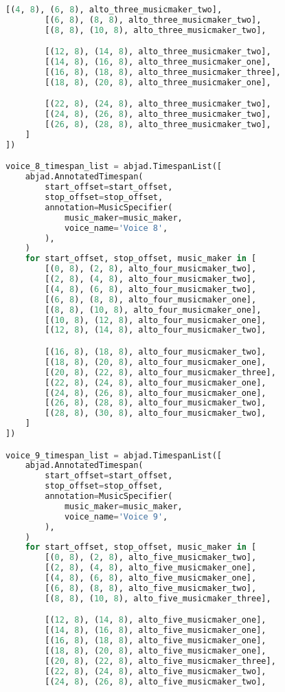 \begin{lstlisting}[language=Python, caption=Invocation Source Code]
        [(4, 8), (6, 8), alto_three_musicmaker_two],
        [(6, 8), (8, 8), alto_three_musicmaker_two],
        [(8, 8), (10, 8), alto_three_musicmaker_two],

        [(12, 8), (14, 8), alto_three_musicmaker_two],
        [(14, 8), (16, 8), alto_three_musicmaker_one],
        [(16, 8), (18, 8), alto_three_musicmaker_three],
        [(18, 8), (20, 8), alto_three_musicmaker_one],

        [(22, 8), (24, 8), alto_three_musicmaker_two],
        [(24, 8), (26, 8), alto_three_musicmaker_two],
        [(26, 8), (28, 8), alto_three_musicmaker_two],
    ]
])

voice_8_timespan_list = abjad.TimespanList([
    abjad.AnnotatedTimespan(
        start_offset=start_offset,
        stop_offset=stop_offset,
        annotation=MusicSpecifier(
            music_maker=music_maker,
            voice_name='Voice 8',
        ),
    )
    for start_offset, stop_offset, music_maker in [
        [(0, 8), (2, 8), alto_four_musicmaker_two],
        [(2, 8), (4, 8), alto_four_musicmaker_two],
        [(4, 8), (6, 8), alto_four_musicmaker_two],
        [(6, 8), (8, 8), alto_four_musicmaker_one],
        [(8, 8), (10, 8), alto_four_musicmaker_one],
        [(10, 8), (12, 8), alto_four_musicmaker_one],
        [(12, 8), (14, 8), alto_four_musicmaker_two],

        [(16, 8), (18, 8), alto_four_musicmaker_two],
        [(18, 8), (20, 8), alto_four_musicmaker_one],
        [(20, 8), (22, 8), alto_four_musicmaker_three],
        [(22, 8), (24, 8), alto_four_musicmaker_one],
        [(24, 8), (26, 8), alto_four_musicmaker_one],
        [(26, 8), (28, 8), alto_four_musicmaker_two],
        [(28, 8), (30, 8), alto_four_musicmaker_two],
    ]
])

voice_9_timespan_list = abjad.TimespanList([
    abjad.AnnotatedTimespan(
        start_offset=start_offset,
        stop_offset=stop_offset,
        annotation=MusicSpecifier(
            music_maker=music_maker,
            voice_name='Voice 9',
        ),
    )
    for start_offset, stop_offset, music_maker in [
        [(0, 8), (2, 8), alto_five_musicmaker_two],
        [(2, 8), (4, 8), alto_five_musicmaker_one],
        [(4, 8), (6, 8), alto_five_musicmaker_one],
        [(6, 8), (8, 8), alto_five_musicmaker_two],
        [(8, 8), (10, 8), alto_five_musicmaker_three],

        [(12, 8), (14, 8), alto_five_musicmaker_one],
        [(14, 8), (16, 8), alto_five_musicmaker_one],
        [(16, 8), (18, 8), alto_five_musicmaker_one],
        [(18, 8), (20, 8), alto_five_musicmaker_one],
        [(20, 8), (22, 8), alto_five_musicmaker_three],
        [(22, 8), (24, 8), alto_five_musicmaker_two],
        [(24, 8), (26, 8), alto_five_musicmaker_two],


\end{lstlisting}
